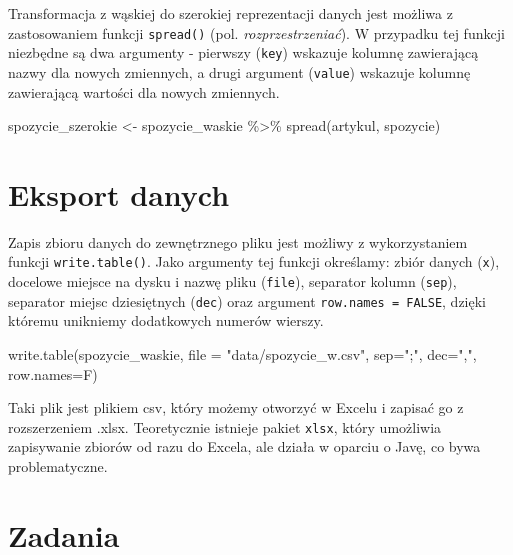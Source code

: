 \documentclass[
]{book}
\newenvironment{Shaded}{\begin{snugshade}}{\end{snugshade}}
\newcommand{\AttributeTok}[1]{\textcolor[rgb]{0.77,0.63,0.00}{#1}}
\newcommand{\FunctionTok}[1]{\textcolor[rgb]{0.00,0.00,0.00}{#1}}
\newcommand{\NormalTok}[1]{#1}
\newcommand{\OtherTok}[1]{\textcolor[rgb]{0.56,0.35,0.01}{#1}}
\newcommand{\SpecialCharTok}[1]{\textcolor[rgb]{0.00,0.00,0.00}{#1}}
\newcommand{\StringTok}[1]{\textcolor[rgb]{0.31,0.60,0.02}{#1}}
\begin{document}
Transformacja z wąskiej do szerokiej reprezentacji danych jest możliwa z zastosowaniem funkcji \texttt{spread()} (pol. \emph{rozprzestrzeniać}). W przypadku tej funkcji niezbędne są dwa argumenty - pierwszy (\texttt{key}) wskazuje kolumnę zawierającą nazwy dla nowych zmiennych, a drugi argument (\texttt{value}) wskazuje kolumnę zawierającą wartości dla nowych zmiennych.

\begin{Shaded}
\begin{Highlighting}[]
\NormalTok{spozycie\_szerokie }\OtherTok{\textless{}{-}}\NormalTok{ spozycie\_waskie }\SpecialCharTok{\%\textgreater{}\%}
  \FunctionTok{spread}\NormalTok{(artykul, spozycie)}
\end{Highlighting}
\end{Shaded}

\hypertarget{eksport-danych}{%
\section{Eksport danych}\label{eksport-danych}}

Zapis zbioru danych do zewnętrznego pliku jest możliwy z wykorzystaniem funkcji \texttt{write.table()}. Jako argumenty tej funkcji określamy: zbiór danych (\texttt{x}), docelowe miejsce na dysku i nazwę pliku (\texttt{file}), separator kolumn (\texttt{sep}), separator miejsc dziesiętnych (\texttt{dec}) oraz argument \texttt{row.names\ =\ FALSE}, dzięki któremu unikniemy dodatkowych numerów wierszy.

\begin{Shaded}
\begin{Highlighting}[]
\FunctionTok{write.table}\NormalTok{(spozycie\_waskie, }\AttributeTok{file =} \StringTok{"data/spozycie\_w.csv"}\NormalTok{, }\AttributeTok{sep=}\StringTok{";"}\NormalTok{, }\AttributeTok{dec=}\StringTok{","}\NormalTok{, }\AttributeTok{row.names=}\NormalTok{F)}
\end{Highlighting}
\end{Shaded}

Taki plik jest plikiem csv, który możemy otworzyć w Excelu i zapisać go z rozszerzeniem .xlsx. Teoretycznie istnieje pakiet \texttt{xlsx}, który umożliwia zapisywanie zbiorów od razu do Excela, ale działa w oparciu o Javę, co bywa problematyczne.

\hypertarget{zadania-2}{%
\section{Zadania}\label{zadania-2}}
\end{document}
